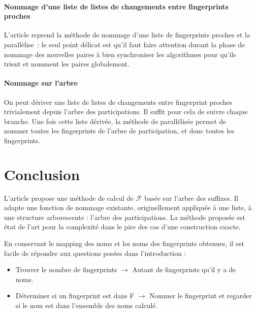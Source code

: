 \documentclass[a4paper]{article}
\begin{document}
\paragraph{Nommage d'une liste de listes de changements entre
  fingerprints proches} L'article reprend la méthode de nommage d'une
liste de fingerprints proches et la parallèlise~: le seul point
délicat est qu'il faut faire attention durant la phase de nommage des
nouvelles paires à bien synchroniser les algorithmes pour qu'ils
trient et nomment les paires globalement.

\paragraph{Nommage sur l'arbre} On peut dériver une liste de listes de
changements entre fingerprint proches trivialement depuis l'arbre des
participations. Il suffit pour cela de suivre chaque branche. Une fois
cette liste dérivée, la méthode de \cite{tsur} parallélisée permet de
nommer toutes les fingerprints de l'arbre de participation, et donc
toutes les fingerprints.

\section{Conclusion}

L'article propose une méthode de calcul de $\mathcal{F}$ basée sur l'arbre des suffixes. Il adapte une fonction de nommage existante, originellement appliquée à une liste, à une structure arborescente : l'arbre des participations. La méthode proposée est état de l'art pour la complexité dans le pire des cas d'une construction exacte. \newline

En conservant le mapping des noms et les noms des fingerprints obtenues, il est facile de répondre aux questions posées dans l'introduction :\newline

\begin{itemize}
	\item Trouver le nombre de fingerprints \newline $\rightarrow$ Autant de fingerprints qu'il y a de noms.
	\item Déterminer si un fingerprint est dans F \newline $\rightarrow$ Nommer le fingerprint et regarder si le nom est dans l'ensemble des noms calculé. \newline
\end{itemize} 



\end{document}
